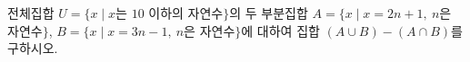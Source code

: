 전체집합 $U=\{x \mid x$는 $10$ 이하의 자연수$\}$의 두 부분집합 $A=\{x \mid x=2n+1,\ n$은 자연수$\}$, $B=\{x \mid x=3n-1,\ n$은 자연수$\}$에 대하여 집합 $(A\cup B)-(A\cap B)$를 구하시오.
